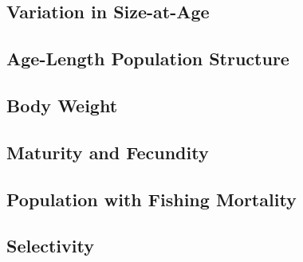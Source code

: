 \documentclass[11pt,
  english,
  letterpaper,
]{article}
\begin{document}

\hypertarget{variation-in-size-at-age}{%
\subsection{Variation in Size-at-Age}\label{variation-in-size-at-age}}

\leavevmode\tagmcend\tagstructend


\hypertarget{age-length-population-structure}{%
\subsection{Age-Length Population Structure}\label{age-length-population-structure}}

\leavevmode\tagmcend\tagstructend


\hypertarget{body-weight}{%
\subsection{Body Weight}\label{body-weight}}

\leavevmode\tagmcend\tagstructend


\hypertarget{maturity-and-fecundity}{%
\subsection{Maturity and Fecundity}\label{maturity-and-fecundity}}

\leavevmode\tagmcend\tagstructend


\hypertarget{population-with-fishing-mortality}{%
\subsection{Population with Fishing Mortality}\label{population-with-fishing-mortality}}

\leavevmode\tagmcend\tagstructend


\hypertarget{selectivity}{%
\subsection{Selectivity}\label{selectivity}}
\end{document}
